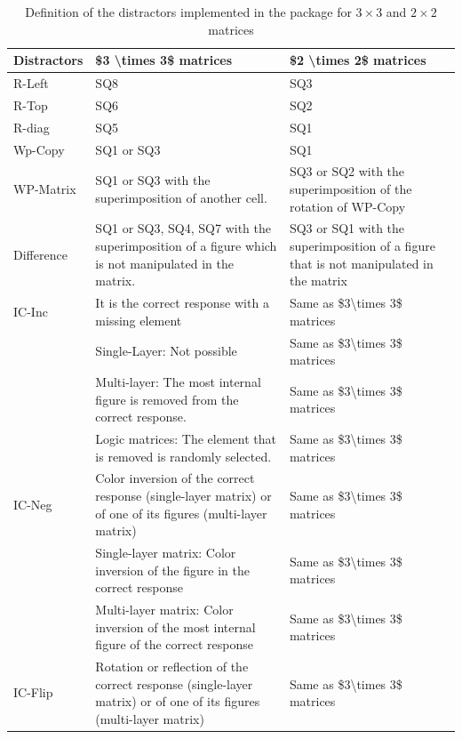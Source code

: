 \begin{table}

\caption{\label{tab:dist-types-tab-static}Definition of the distractors implemented in the  package for $3 \times 3$ and $2 \times 2$ matrices}
\centering
\begin{tabular}[t]{l|l|l}
\hline
Distractors & \$3 \textbackslash{}times 3\$ matrices & \$2 \textbackslash{}times 2\$ matrices\\
\hline
R-Left & SQ8 & SQ3\\
\hline
R-Top & SQ6 & SQ2\\
\hline
R-diag & SQ5 & SQ1\\
\hline
Wp-Copy & SQ1 or SQ3 & SQ1\\
\hline
WP-Matrix & SQ1 or SQ3 with the superimposition of another cell. & SQ3 or SQ2 with the superimposition of the rotation of WP-Copy\\
\hline
Difference & SQ1 or SQ3, SQ4, SQ7 with the superimposition of a figure which is not manipulated in the matrix. & SQ3 or SQ1 with the superimposition of a figure that is not manipulated in the matrix\\
\hline
IC-Inc & It is the correct response with a missing element & Same as \$3\textbackslash{}times 3\$ matrices\\
\hline
 & Single-Layer: Not possible & Same as \$3\textbackslash{}times 3\$ matrices\\
\hline
 & Multi-layer: The most internal figure is removed from the correct response. & Same as \$3\textbackslash{}times 3\$ matrices\\
\hline
 & Logic matrices: The element that is removed is randomly selected. & Same as \$3\textbackslash{}times 3\$ matrices\\
\hline
IC-Neg & Color inversion of the correct response (single-layer matrix) or of one of its figures (multi-layer matrix) & Same as \$3\textbackslash{}times 3\$ matrices\\
\hline
 & Single-layer matrix:     Color inversion of the figure in the correct response & Same as \$3\textbackslash{}times 3\$ matrices\\
\hline
 & Multi-layer matrix: Color inversion of the most internal figure of the correct response & Same as \$3\textbackslash{}times 3\$ matrices\\
\hline
IC-Flip & Rotation or reflection of the correct response (single-layer matrix) or of one of its figures (multi-layer matrix) & Same as \$3\textbackslash{}times 3\$ matrices\\

\end{tabular}
\end{table}
